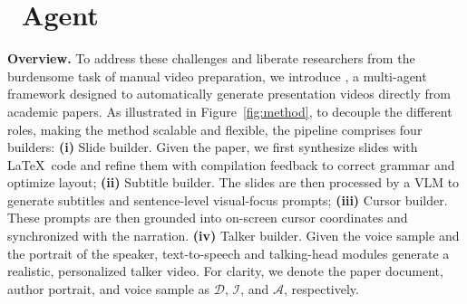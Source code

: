 
\vspace{-0.5\baselineskip} 
\section{\agent~Agent}
\vspace{-0.6\baselineskip} 
\textbf{Overview.} 
To address these challenges and liberate researchers from the burdensome task of manual video preparation, we introduce {\agent}, a multi-agent framework designed to automatically generate presentation videos directly from academic papers. 
As illustrated in Figure~\ref{fig:method}, to decouple the different roles, making the method scalable and flexible, the pipeline comprises four builders:
\textbf{(i)} Slide builder. Given the paper, we first synthesize slides with \LaTeX~code and refine them with compilation feedback to correct grammar and optimize layout; 
\textbf{(ii)} Subtitle builder. The slides are then processed by a VLM to generate subtitles and sentence-level visual-focus prompts;  \textbf{(iii)} Cursor builder. These prompts are then grounded into on-screen cursor coordinates and synchronized with the narration.
\textbf{(iv)} Talker builder. Given the voice sample and the portrait of the speaker, text-to-speech and talking-head modules generate a realistic, personalized talker video. 
For clarity, we denote the paper document, author portrait, and voice sample as $\mathcal{D}$, $\mathcal{I}$, and $\mathcal{A}$, respectively.



